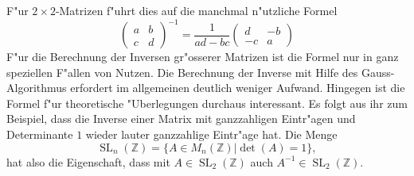 F"ur $2\times2$-Matrizen f"uhrt dies auf die manchmal n"utzliche
Formel
\[
\begin{pmatrix}
a&b\\c&d
\end{pmatrix}^{-1}
=
\frac1{ad-bc}\begin{pmatrix}
d&-b\\-c&a
\end{pmatrix}
\]
F"ur die Berechnung der Inversen gr"osserer Matrizen ist die Formel
nur in ganz speziellen F"allen von Nutzen. Die Berechnung der Inverse
mit Hilfe des Gauss-Algorithmus erfordert im allgemeinen deutlich weniger
Aufwand.
Hingegen ist die Formel f"ur theoretische "Uberlegungen durchaus
interessant. Es folgt aus ihr zum Beispiel, dass die Inverse einer
Matrix mit ganzzahligen Eintr"agen und Determinante $1$ wieder
lauter ganzzahlige Eintr"age hat. Die Menge
\[
\operatorname{SL}_n(\mathbb Z)=\{A\in M_{n}(\mathbb Z)|\det(A)=1\},
\]
hat also die Eigenschaft, dass mit $A\in\operatorname{SL}_2(\mathbb Z)$ 
auch $A^{-1}\in\operatorname{SL}_2(\mathbb Z)$.

